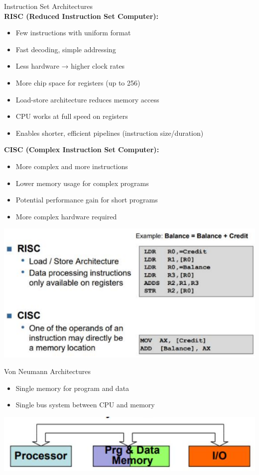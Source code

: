 \begin{concept}{Instruction Set Architectures}\\
\textbf{RISC (Reduced Instruction Set Computer):}
\begin{itemize}
  \item Few instructions with uniform format
  \item Fast decoding, simple addressing
  \item Less hardware → higher clock rates
  \item More chip space for registers (up to 256)
  \item Load-store architecture reduces memory access
  \item CPU works at full speed on registers
  \item Enables shorter, efficient pipelines (instruction size/duration)
\end{itemize}

\textbf{CISC (Complex Instruction Set Computer):}
\begin{itemize}
  \item More complex and more instructions
  \item Lower memory usage for complex programs
  \item Potential performance gain for short programs
  \item More complex hardware required
\end{itemize}

\includegraphics[width=\linewidth]{images/risc_cisc.png}
\end{concept}

\begin{definition}{Von Neumann Architectures}
\begin{itemize}
  \item Single memory for program and data
  \item Single bus system between CPU and memory
\end{itemize}

\includegraphics[width=0.7\linewidth]{images/2024_12_29_79e6b22f503fb7b4f718g-13}
\end{definition}

